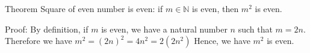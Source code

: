 Theorem Square of even number is even: 
if $m \in \mathbb{N}$ is even, then $m^2$ is even.


Proof:
By definition, if $m$ is even, we have a natural number $n$ such that $m = 2n$.
Therefore we have $m^2 = (2n)^2 = 4n^2 = 2(2n^2)$
Hence, we have $m^2$ is even.